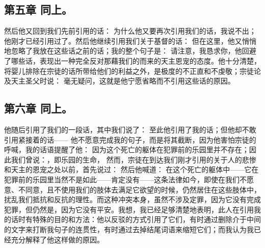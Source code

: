 
\subsection{第五章 同上。}

然后他又回到我们先前引用的话： 为什么他又要再次引用我们的话，我说不出；他刚才已经引用过了。然后他继续引用我们关于基督的话： 但在这里，他又悄悄地忽略了我放在这些话之前的话；我的整个句子是： 请注意，我恳求你，他回避了哪些话，表现出一种完全反对那藉我们的而来的天主恩宠的态度。他十分清楚，将婴儿排除在宗徒的话所带给他们的利益之外，是极度的不正直和不虔敬；宗徒论及天主圣父时说： 毫无疑问，这就是他宁愿省略而不引用这些话的原因。\par


\subsection{第六章 同上。}

他随后引用了我们的一段话，其中我们说了： 至此他引用了我的话；但他却不敢引用紧接着的话—— 他不愿意完成我的句子，而是将其截断，因为他害怕宗徒的呼喊，我的话语提醒了他：  因为这个死亡的躯体在犯罪前的乐园里并不存在；因此我们曾说：，即乐园的生命， 然而，宗徒在到达我们刚才引用的关于人的悲惨和天主的恩宠之处以前，首先说过： 然后他喊道： 在这个死亡的躯体中——它在犯罪前的乐园里当然不是如此——肯定没有——这条法律如今，即使在我们不愿意、不同意，且不使用我们的肢体去满足它欲望的时候，仍然居住在这些肢体中，扰乱我们抵抗和反抗的理性。而这种冲突本身，虽然不涉及定罪，因为它没有完成犯罪，但仍然是，因为它没有平安。我想，我已经足够清楚地表明，此人在引用我的话时有特殊的目的和方法：他以反驳的方式引用了它们，有时通过删除介于中间的文字来打断我句子的连贯性，有时通过去掉结尾词语来缩短它们；而我认为我已经充分解释了他这样做的原因。\par

